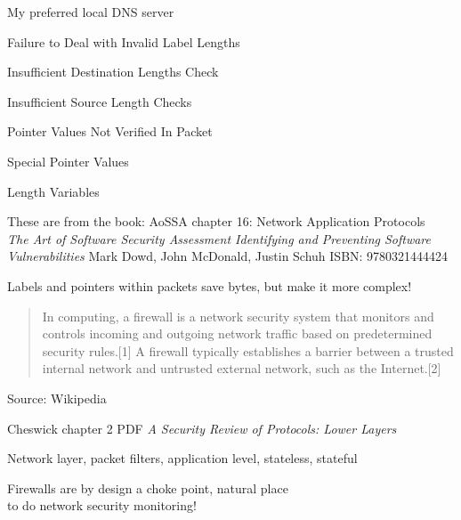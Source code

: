 \documentclass[Screen16to9,17pt]{foils}
\begin{document}
My preferred local DNS server



\begin{list2}
\item Failure to Deal with Invalid Label Lengths
\item Insufficient Destination Lengths Check
\item Insufficient Source Length Checks
\item Pointer Values Not Verified In Packet
\item Special Pointer Values
\item Length Variables
\item These are from the book: AoSSA chapter 16: Network Application Protocols\\
\emph{The Art of Software Security Assessment Identifying and Preventing
Software Vulnerabilities}
Mark Dowd, John McDonald, Justin Schuh ISBN: 9780321444424
\end{list2}

\vskip 1cm
\centerline{Labels and pointers within packets save bytes, but make it more complex!}



\begin{quote}
In computing, a firewall is a network security system that monitors and controls incoming and outgoing network traffic based on predetermined security rules.[1] A firewall typically establishes a barrier between a trusted internal network and untrusted external network, such as the Internet.[2]
\end{quote} Source: Wikipedia

\begin{list2}
\item {}
\item {} Cheswick chapter 2 PDF
\emph{A Security Review of Protocols:
Lower Layers}
\item Network layer, packet filters, application level, stateless, stateful
\end{list2}

Firewalls are by design a choke point, natural place \\
to do network security monitoring!



\end{document}
